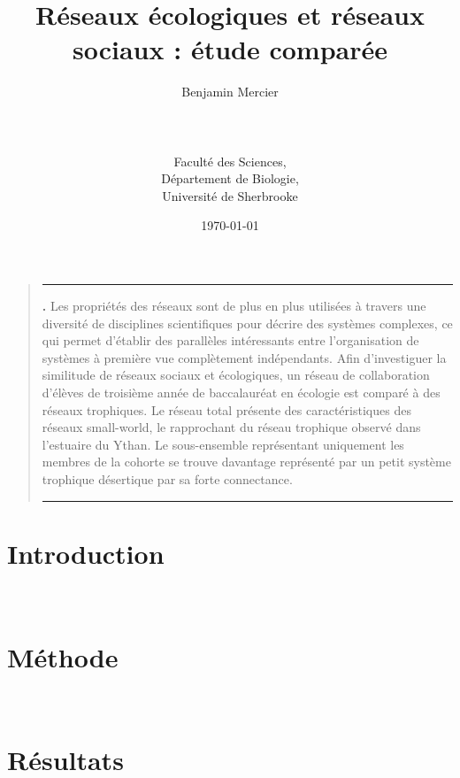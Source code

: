 \documentclass[12pt]{article}
\title{Réseaux écologiques et réseaux sociaux : étude comparée}
\author{Benjamin Mercier\\
        \\
        \\
        \\
        Faculté des Sciences,\\
        Département de Biologie,\\
        Université de Sherbrooke
       }
\date{\today}
\begin{document}
\begin{titlepage}
\maketitle
\end{titlepage}

\renewenvironment{abstract}
{\begin{quote}
\noindent \rule{\linewidth}{.5pt}\par{\bfseries \abstractname.}}
{\medskip\noindent \rule{\linewidth}{.5pt}
\end{quote}
}

\begin{center}
    \begin{abstract}
      Les propriétés des réseaux sont de plus en plus utilisées à travers une diversité de disciplines scientifiques pour décrire des systèmes complexes,
      ce qui permet d’établir des parallèles intéressants entre l’organisation de systèmes à première vue complètement indépendants.
      Afin d’investiguer la similitude de réseaux sociaux et écologiques, un réseau de collaboration d’élèves de troisième année de baccalauréat en écologie est
      comparé à des réseaux trophiques. Le réseau total présente des caractéristiques des réseaux small-world, le rapprochant du réseau trophique observé dans
      l’estuaire du Ythan. Le sous-ensemble représentant uniquement les membres de la cohorte se trouve davantage représenté par un petit système trophique
       désertique par sa forte connectance.\\
  \end{abstract}
\end{center}


\section{Introduction}

\\



\section{Méthode}

\\


\section{Résultats}
\end{document}

